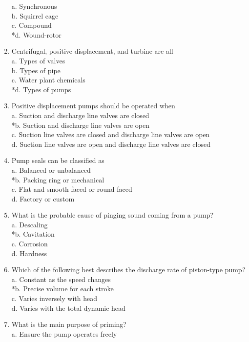 \begin{enumerate}[1.]
a. Synchronous\\
b. Squirrel cage\\
c. Compound\\
*d. Wound-rotor\\
\item Centrifugal, positive displacement, and turbine are all\\
a. Types of valves\\
b. Types of pipe\\
c. Water plant chemicals\\
*d. Types of pumps\\
\item Positive displacement pumps should be operated when\\
a. Suction and discharge line valves are closed\\
*b. Suction and discharge line valves are open\\
c. Suction line valves are closed and discharge line valves are open\\
d. Suction line valves are open and discharge line valves are closed\\
\item Pump seals can be classified as\\
a. Balanced or unbalanced\\
*b. Packing ring or mechanical\\
c. Flat and smooth faced or round faced\\
d. Factory or custom\\
\item What is the probable cause of pinging sound coming from a pump?\\
a. Descaling\\
*b. Cavitation\\
c. Corrosion\\
d. Hardness\\
\item Which of the following best describes the discharge rate of piston-type pump?\\
a. Constant as the speed changes\\
*b. Precise volume for each stroke\\
c. Varies inversely with head\\
d. Varies with the total dynamic head\\
\item What is the main purpose of priming?\\
a. Ensure the pump operates freely\\

\end{enumerate}
